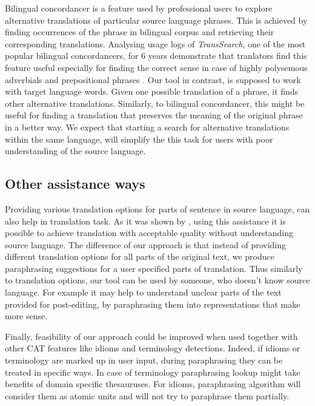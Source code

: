 Bilingual concordancer is a feature used by professional users to explore alternative translations of particular source language phrases. This is achieved by finding occurrences of the phrase in bilingual corpus and retrieving their corresponding translations. Analysing usage logs of \emph{TransSearch}, one of the most popular bilingual concordancers, for 6 years demonstrate that tranlators find this feature useful especially for finding the correct sense in case of highly polysemous adverbials and prepositional phrases \cite{Macklovitch2008}. Our tool in contrast, is supposed to work with target language words. Given one possible translation of a phrase, it finds other alternative translations. Similarly, to bilingual concordancer, this might be useful for finding a translation that preserves the meaning of the original phrase in a better way. We expect that starting a search for alternative translations within the same language, will simplify the this task for users with poor understanding of the source language.

\subsection{Other assistance ways}

Providing various translation options for parts of sentence in source language, can also help in translation task. As it was shown by \cite{Koehn2010}, using this assistance it is possible to achieve translation with acceptable quality without understanding source language. The difference of our approach is that instead of providing different translation options for all parts of the original text, we produce paraphrasing suggestions for a user specified parts of translation. Thus similarly to translation options, our tool can be used by someone, who doesn't know source language. For example it may help to understand unclear parts of the text provided for post-editing, by paraphrasing them into representations that make more sense.

Finally, feasibility of our approach could be improved when used together with other CAT features like idioms and terminology detections. Indeed, if idioms or terminology are marked up in user input, during paraphrasing they can be treated in specific ways. In case of terminology paraphrasing lookup might take benefits of domain specific thesauruses. For idioms, paraphrasing algorithm will consider them as atomic units and will not try to paraphrase them partially. 

